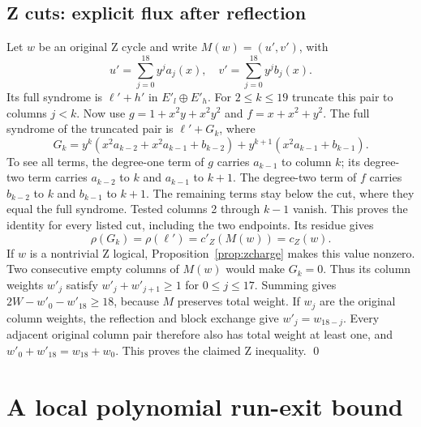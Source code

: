 \documentclass{article}
\begin{document}
\subsection{Z cuts: explicit flux after reflection}\label{sec:z-cuts}

Let \(w\) be an original Z cycle and write \(M(w) = (u', v')\), with
\begin{equation}
  u' = \sum_{j=0}^{18} y^j a_j(x), \quad v' = \sum_{j=0}^{18} y^j b_j(x).
\end{equation}
Its full syndrome is \(\ell' + h'\) in \(E'_l \oplus E'_h\). For \(2 \le k \le 19\) truncate this
pair to columns \(j < k\). Now use \(g = 1 + x^2 y + x^2 y^2\) and \(f = x + x^2 + y^2\). The full
syndrome of the truncated pair is \(\ell' + G_k\), where
\begin{equation}
  G_k = y^k (x^2 a_{k-2} + x^2 a_{k-1} + b_{k-2}) + y^{k+1} (x^2 a_{k-1} + b_{k-1}).
\end{equation}
To see all terms, the degree-one term of \(g\) carries \(a_{k-1}\) to column \(k\); its
degree-two term carries \(a_{k-2}\) to \(k\) and \(a_{k-1}\) to \(k+1\). The degree-two term of
\(f\) carries \(b_{k-2}\) to \(k\) and \(b_{k-1}\) to \(k+1\). The remaining terms stay below the
cut, where they equal the full syndrome. Tested columns 2 through \(k-1\) vanish. This proves the
identity for every listed cut, including the two endpoints. Its residue gives
\begin{equation}
  \rho(G_k) = \rho(\ell') = c'_Z(M(w)) = c_Z(w).
\end{equation}
If \(w\) is a nontrivial Z logical, Proposition~\ref{prop:zcharge} makes this value nonzero. Two
consecutive empty columns of \(M(w)\) would make \(G_k = 0\). Thus its column weights \(w'_j\)
satisfy \(w'_j + w'_{j+1} \ge 1\) for \(0 \le j \le 17\). Summing gives
\(2W - w'_0 - w'_{18} \ge 18\), because \(M\) preserves total weight. If \(w_j\) are the original
column weights, the reflection and block exchange give \(w'_j = w_{18-j}\). Every adjacent
original column pair therefore also has total weight at least one, and
\(w'_0 + w'_{18} = w_{18} + w_0\). This proves the claimed Z inequality. \qed

\section{A local polynomial run-exit bound}\label{sec:local}
\end{document}
